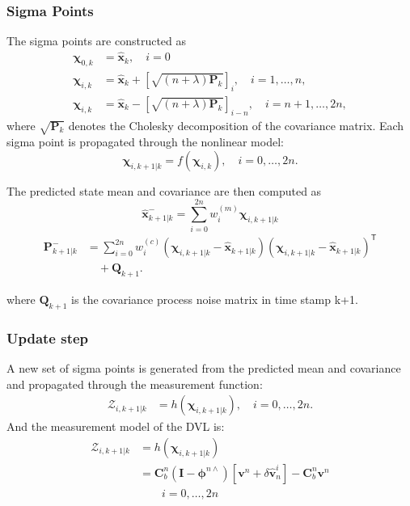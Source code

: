 \documentclass[conference]{IEEEtran}
\begin{document}
\subsubsection{Sigma Points}
%
\noindent The sigma points are constructed as
\begin{align}
\boldsymbol{\chi}_{0,k} &= \hat{\mathbf{x}}_{k}, \quad i=0 \\
\boldsymbol{\chi}_{i,k} &= \hat{\mathbf{x}}_{k}
+ \left[\sqrt{(n+\lambda)\mathbf{P}_{k}}\right]_i,
\quad i = 1, \ldots, n, \\
\boldsymbol{\chi}_{i,k} &= \hat{\mathbf{x}}_{k}
- \left[\sqrt{(n+\lambda)\mathbf{P}_{k}}\right]_{i-n},
\quad i = n+1, \ldots, 2n,
\end{align}
\noindent where $\sqrt{\mathbf{P}_{k}}$ denotes the Cholesky decomposition of the covariance matrix.
\noindent Each sigma point is propagated through the nonlinear model:
\begin{equation}
\boldsymbol{\chi}_{i,k+1|k} = f(\boldsymbol{\chi}_{i,k}), \quad i = 0, \ldots, 2n.
\end{equation}

\noindent The predicted state mean and covariance are then computed as
\begin{equation}
\hat{\mathbf{x}}_{k+1|k}^{-} =
\sum_{i=0}^{2n} w_i^{(m)} \boldsymbol{\chi}_{i,k+1|k}    
\end{equation}
\begin{equation}
\begin{aligned}
\mathbf{P}_{k+1|k}^{-} &=
\sum_{i=0}^{2n} w_i^{(c)}
(\boldsymbol{\chi}_{i,k+1|k} - \hat{\mathbf{x}}_{k+1|k})
(\boldsymbol{\chi}_{i,k+1|k} - \hat{\mathbf{x}}_{k+1|k})^\mathsf{T} \\
&\quad + \mathbf{Q}_{k+1}.
\end{aligned}
\end{equation}

\noindent where $\mathbf{Q}_{k+1}$ is the covariance process noise matrix in time stamp k+1.
%
\subsubsection{Update step}
%
\noindent A new set of sigma points is generated from the predicted mean and covariance and propagated through the measurement function:
\begin{align}
\mathbf{\mathcal{Z}}_{i,k+1|k} &= h(\boldsymbol{\chi}_{i,k+1|k}), \quad i = 0, \ldots, 2n.
\end{align}
\noindent And the measurement model of the DVL is:
\begin{align}
\mathbf{\mathcal{Z}}_{i,k+1|k}
&=
h\left(\mathbf{\chi}_{i,k+1|k}\right) \\
&=
\mathbf{C}_b^n
\left(
\mathbf{I}-\boldsymbol{\phi}^{n\wedge}
\right)
\left[
\mathbf{v}^n+\delta\hat{\mathbf{v}}_n^i
\right]
-
\mathbf{C}_b^n\mathbf{v}^n \\
& \qquad i=0,\ldots,2n
\end{align}
\end{document}
